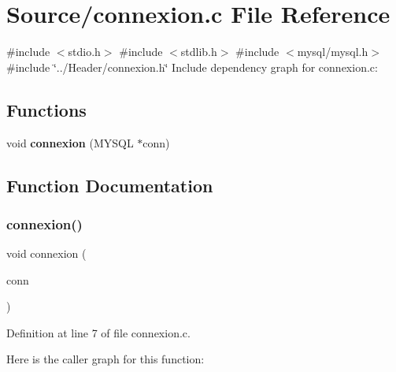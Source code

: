 \section{Source/connexion.c File Reference}
\label{connexion_8c}
{\ttfamily \#include $<$stdio.\+h$>$}\newline
{\ttfamily \#include $<$stdlib.\+h$>$}\newline
{\ttfamily \#include $<$mysql/mysql.\+h$>$}\newline
{\ttfamily \#include \char`\"{}../\+Header/connexion.\+h\char`\"{}}\newline
Include dependency graph for connexion.\+c\+:
\subsection*{Functions}
\begin{DoxyCompactItemize}
\item 
void \textbf{ connexion} (M\+Y\+S\+QL $\ast$conn)
\end{DoxyCompactItemize}


\subsection{Function Documentation}
\mbox{\label{connexion_8c_a9d9a95cb3f145d625490698dc9a36981}} 
\subsubsection{connexion()}
{\footnotesize\ttfamily void connexion (\begin{DoxyParamCaption}\item[{M\+Y\+S\+QL $\ast$}]{conn }\end{DoxyParamCaption})}



Definition at line 7 of file connexion.\+c.

Here is the caller graph for this function\+:
